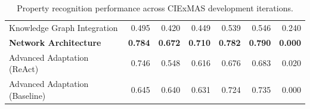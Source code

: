 \documentclass[a4paper,oneside,bibliography=totoc]{scrbook}
\begin{document}
\begin{table}[h]
\begin{tabular}{p{4cm}|rrrrrr}
    Knowledge Graph Integration                  & 0.495                                            & 0.420          & 0.449          & 0.539          & 0.546          & 0.240          \\
    \textbf{Network Architecture}                & \textbf{0.784}                                   & \textbf{0.672} & \textbf{0.710} & \textbf{0.782} & \textbf{0.790} & \textbf{0.000} \\
    Advanced Adaptation (\ac{ReAct})             & 0.746                                            & 0.548          & 0.616          & 0.676          & 0.683          & 0.020          \\
    Advanced Adaptation (Baseline)               & 0.645                                            & 0.640          & 0.631          & 0.724          & 0.735          & 0.000          \\
    \bottomrule
  \end{tabular}
  \caption{Property recognition performance across CIExMAS development iterations.}
  \label{tab:evaluation_properties_iterations}
\end{table}
\end{document}
